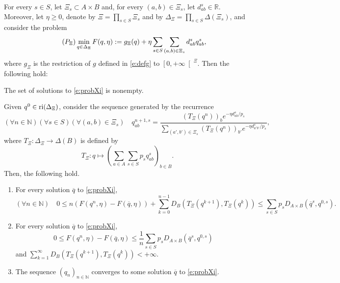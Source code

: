 \documentclass[smallextended,referee,envcountsect,]{svjour3}
\newcommand{\RP}{\ensuremath{\left[0,+\infty\right[}}
\newcommand{\NN}{{\mathbb N}}
\newcommand{\R}{{\mathbb R}}
\begin{document}
\begin{theorem}
\label{t:convgen}
For every $s\in S$, let $\Xi_s\subset A\times B$ {and, 
for every $(a,b)\in\Xi_s$, let $d_{ab}^s\in\R$.
Moreover, let $\eta\ge 0$,} denote by 
$\Xi=\prod_{s\in S}\Xi_s$ and by $\Delta_\Xi=\prod_{s\in 
S}\Delta(\Xi_s)$, and consider the problem
\begin{equation}
\label{e:probXi}\tag{$P_{\Xi}$}
\min_{q\in\Delta_{\Xi}}F(q,\eta):={g_{\Xi}(q)}
+\eta\sum_{s\in S}
\sum_{(a,b)\in \Xi_s}d_{ab}^sq_{ab}^s,
\end{equation}
where {$g_{\Xi}$ is the restriction of $g$ 
defined in 
\eqref{e:defg} to $\RP^\Xi$.} Then 
the following hold:
\begin{enumerate}
\item\label{t:convgeni} {The set of solutions to 
\eqref{e:probXi} is 
nonempty.
\item\label{t:convgenii}  Given $q^0\in {\rm 
ri}(\Delta_\Xi)$, 
consider the sequence generated 
by the recurrence 
\begin{equation}
\label{e:recursXi}
(\forall n\in\NN)(\forall s\in S)(\forall (a,b)\in \Xi_s)\quad 
q_{ab}^{n+1,s}=
\frac{(T_\Xi(q^n))_be^{-\eta 
d_{ab}^s/p_s}}{\sum\limits_{(a',b')\in\Xi_s}
(T_\Xi(q^n))_{b'}e^{-\eta 
d_{a'b'}^s/p_s}}, 
\end{equation}
where $T_{\Xi}\colon\Delta_\Xi\to 
\Delta(B)$ is defined by 
\begin{equation}
\label{e:TXi}
T{_\Xi}\colon 
q\mapsto \left(\sum_{a\in A}\sum_{s\in S}p_sq_{ab}^s\right)_{b\in 
B}.
\end{equation}
Then, the following hold.
\begin{enumerate}
\item \label{t:convgeniia}For every solution $\overline{q}$ to 
\eqref{e:probXi}, 
\begin{equation}
\label{e:o1k}
(\forall n\in\NN)\quad 0\le 
n(F(q^{n},\eta)
-F(\overline{q},\eta))+\sum_{k=0}^{n-1}
D_B(T_{\Xi}(q^{k+1}),T_{\Xi}(q^{k}))\le 
\sum_{s\in S}p_sD_{A\times B}(\overline{q}^s,q^{0,s}).
\end{equation}
\item\label{t:convgeniib} For every solution $\overline{q}$ to 
\eqref{e:probXi}, 
$$0\le F(q^{n},\eta)
-F(\overline{q},\eta)\le \frac{1}{n}\sum_{s\in S}p_sD_{A\times 
B}(\overline{q}^s,q^{0,s})$$ 
and 
$\sum_{k=1}^{\infty}D_B(T_{\Xi}(q^{k+1}),T_{\Xi}(q^{k}))<+\infty$.

\item \label{t:convgeniic}
The sequence $(q_n)_{n\in\NN}$ converges to some solution 
$\overline{q}$ to 
\eqref{e:probXi}. 
\end{enumerate}
}








\end{enumerate}

\end{theorem}
\end{document}
